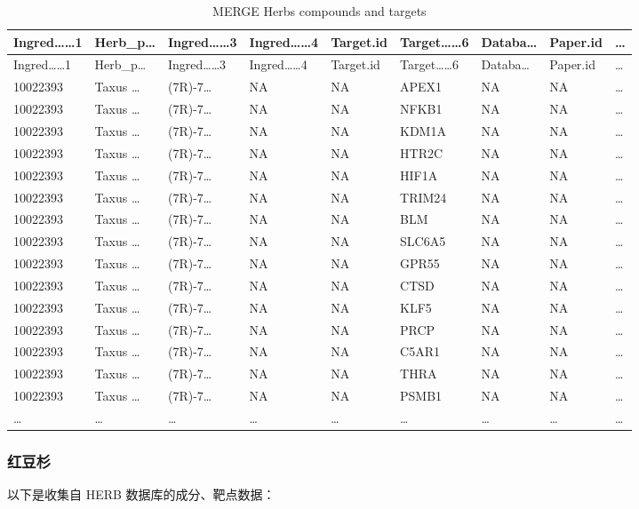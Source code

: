\documentclass[
]{article}
\begin{document}
\begin{longtable}[]{@{}lllllllll@{}}
\caption{\label{tab:MERGE-Herbs-compounds-and-targets}MERGE Herbs compounds and targets}\tabularnewline
\toprule
Ingred\ldots\ldots1 & Herb\_p\ldots{} & Ingred\ldots\ldots3 & Ingred\ldots\ldots4 & Target.id & Target\ldots\ldots6 & Databa\ldots{} & Paper.id & \ldots{}\tabularnewline
\midrule
\endfirsthead
\toprule
Ingred\ldots\ldots1 & Herb\_p\ldots{} & Ingred\ldots\ldots3 & Ingred\ldots\ldots4 & Target.id & Target\ldots\ldots6 & Databa\ldots{} & Paper.id & \ldots{}\tabularnewline
\midrule
\endhead
10022393 & Taxus \ldots{} & (7R)-7\ldots{} & NA & NA & APEX1 & NA & NA & \ldots{}\tabularnewline
10022393 & Taxus \ldots{} & (7R)-7\ldots{} & NA & NA & NFKB1 & NA & NA & \ldots{}\tabularnewline
10022393 & Taxus \ldots{} & (7R)-7\ldots{} & NA & NA & KDM1A & NA & NA & \ldots{}\tabularnewline
10022393 & Taxus \ldots{} & (7R)-7\ldots{} & NA & NA & HTR2C & NA & NA & \ldots{}\tabularnewline
10022393 & Taxus \ldots{} & (7R)-7\ldots{} & NA & NA & HIF1A & NA & NA & \ldots{}\tabularnewline
10022393 & Taxus \ldots{} & (7R)-7\ldots{} & NA & NA & TRIM24 & NA & NA & \ldots{}\tabularnewline
10022393 & Taxus \ldots{} & (7R)-7\ldots{} & NA & NA & BLM & NA & NA & \ldots{}\tabularnewline
10022393 & Taxus \ldots{} & (7R)-7\ldots{} & NA & NA & SLC6A5 & NA & NA & \ldots{}\tabularnewline
10022393 & Taxus \ldots{} & (7R)-7\ldots{} & NA & NA & GPR55 & NA & NA & \ldots{}\tabularnewline
10022393 & Taxus \ldots{} & (7R)-7\ldots{} & NA & NA & CTSD & NA & NA & \ldots{}\tabularnewline
10022393 & Taxus \ldots{} & (7R)-7\ldots{} & NA & NA & KLF5 & NA & NA & \ldots{}\tabularnewline
10022393 & Taxus \ldots{} & (7R)-7\ldots{} & NA & NA & PRCP & NA & NA & \ldots{}\tabularnewline
10022393 & Taxus \ldots{} & (7R)-7\ldots{} & NA & NA & C5AR1 & NA & NA & \ldots{}\tabularnewline
10022393 & Taxus \ldots{} & (7R)-7\ldots{} & NA & NA & THRA & NA & NA & \ldots{}\tabularnewline
10022393 & Taxus \ldots{} & (7R)-7\ldots{} & NA & NA & PSMB1 & NA & NA & \ldots{}\tabularnewline
\ldots{} & \ldots{} & \ldots{} & \ldots{} & \ldots{} & \ldots{} & \ldots{} & \ldots{} & \ldots{}\tabularnewline
\bottomrule
\end{longtable}

\hypertarget{ux7ea2ux8c46ux6749}{%
\subsubsection{红豆杉}\label{ux7ea2ux8c46ux6749}}

以下是收集自 HERB 数据库的成分、靶点数据：
\end{document}
